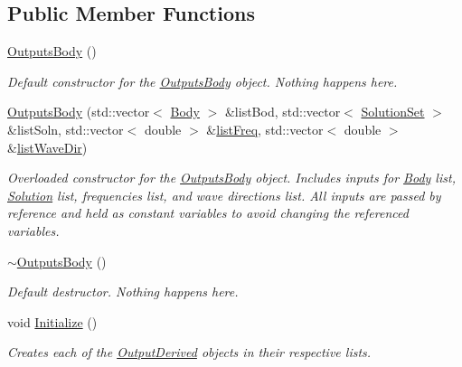 \subsection*{Public Member Functions}
\begin{DoxyCompactItemize}
\item 
\hyperlink{classosea_1_1ofreq_1_1_outputs_body_a6898483a0919f9bb9cd82e3036a59a14}{Outputs\-Body} ()
\begin{DoxyCompactList}\small\item\em Default constructor for the \hyperlink{classosea_1_1ofreq_1_1_outputs_body}{Outputs\-Body} object. Nothing happens here. \end{DoxyCompactList}\item 
\hyperlink{classosea_1_1ofreq_1_1_outputs_body_a03921b36c8a8323eb08355d267c0c626}{Outputs\-Body} (std\-::vector$<$ \hyperlink{classosea_1_1ofreq_1_1_body}{Body} $>$ \&list\-Bod, std\-::vector$<$ \hyperlink{classosea_1_1ofreq_1_1_solution_set}{Solution\-Set} $>$ \&list\-Soln, std\-::vector$<$ double $>$ \&\hyperlink{classosea_1_1ofreq_1_1_outputs_body_a6b28621ef475c1d917270e2259e1629f}{list\-Freq}, std\-::vector$<$ double $>$ \&\hyperlink{classosea_1_1ofreq_1_1_outputs_body_a710a66d19fb8ba5a6c9c15e0143f832e}{list\-Wave\-Dir})
\begin{DoxyCompactList}\small\item\em Overloaded constructor for the \hyperlink{classosea_1_1ofreq_1_1_outputs_body}{Outputs\-Body} object. Includes inputs for \hyperlink{classosea_1_1ofreq_1_1_body}{Body} list, \hyperlink{classosea_1_1ofreq_1_1_solution}{Solution} list, frequencies list, and wave directions list. All inputs are passed by reference and held as constant variables to avoid changing the referenced variables. \end{DoxyCompactList}\item 
\hyperlink{classosea_1_1ofreq_1_1_outputs_body_a9ec0c3721f511168c425b792bdaf2d62}{$\sim$\-Outputs\-Body} ()
\begin{DoxyCompactList}\small\item\em Default destructor. Nothing happens here. \end{DoxyCompactList}\item 
void \hyperlink{classosea_1_1ofreq_1_1_outputs_body_a662db07d35c5f329098a70a838ec868c}{Initialize} ()
\begin{DoxyCompactList}\small\item\em Creates each of the \hyperlink{classosea_1_1ofreq_1_1_output_derived}{Output\-Derived} objects in their respective lists. \end{DoxyCompactList}\item 

\end{DoxyCompactItemize}
